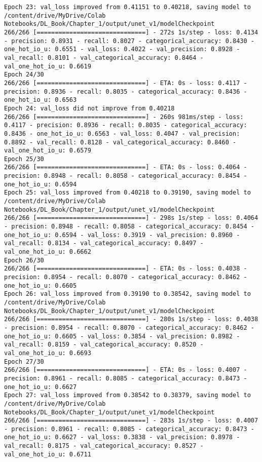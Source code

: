 \documentclass[
  letterpaper,
  DIV=11,
  numbers=noendperiod]{scrreprt}
\begin{document}
\begin{verbatim}
Epoch 23: val_loss improved from 0.41151 to 0.40218, saving model to /content/drive/MyDrive/Colab Notebooks/DL_Book/Chapter_1/output/unet_v1/modelCheckpoint
266/266 [==============================] - 272s 1s/step - loss: 0.4134 - precision: 0.8931 - recall: 0.8027 - categorical_accuracy: 0.8430 - one_hot_io_u: 0.6551 - val_loss: 0.4022 - val_precision: 0.8928 - val_recall: 0.8101 - val_categorical_accuracy: 0.8464 - val_one_hot_io_u: 0.6619
Epoch 24/30
266/266 [==============================] - ETA: 0s - loss: 0.4117 - precision: 0.8936 - recall: 0.8035 - categorical_accuracy: 0.8436 - one_hot_io_u: 0.6563
Epoch 24: val_loss did not improve from 0.40218
266/266 [==============================] - 260s 981ms/step - loss: 0.4117 - precision: 0.8936 - recall: 0.8035 - categorical_accuracy: 0.8436 - one_hot_io_u: 0.6563 - val_loss: 0.4047 - val_precision: 0.8892 - val_recall: 0.8128 - val_categorical_accuracy: 0.8460 - val_one_hot_io_u: 0.6579
Epoch 25/30
266/266 [==============================] - ETA: 0s - loss: 0.4064 - precision: 0.8948 - recall: 0.8058 - categorical_accuracy: 0.8454 - one_hot_io_u: 0.6594
Epoch 25: val_loss improved from 0.40218 to 0.39190, saving model to /content/drive/MyDrive/Colab Notebooks/DL_Book/Chapter_1/output/unet_v1/modelCheckpoint
266/266 [==============================] - 298s 1s/step - loss: 0.4064 - precision: 0.8948 - recall: 0.8058 - categorical_accuracy: 0.8454 - one_hot_io_u: 0.6594 - val_loss: 0.3919 - val_precision: 0.8960 - val_recall: 0.8134 - val_categorical_accuracy: 0.8497 - val_one_hot_io_u: 0.6662
Epoch 26/30
266/266 [==============================] - ETA: 0s - loss: 0.4038 - precision: 0.8954 - recall: 0.8070 - categorical_accuracy: 0.8462 - one_hot_io_u: 0.6605
Epoch 26: val_loss improved from 0.39190 to 0.38542, saving model to /content/drive/MyDrive/Colab Notebooks/DL_Book/Chapter_1/output/unet_v1/modelCheckpoint
266/266 [==============================] - 280s 1s/step - loss: 0.4038 - precision: 0.8954 - recall: 0.8070 - categorical_accuracy: 0.8462 - one_hot_io_u: 0.6605 - val_loss: 0.3854 - val_precision: 0.8982 - val_recall: 0.8159 - val_categorical_accuracy: 0.8520 - val_one_hot_io_u: 0.6693
Epoch 27/30
266/266 [==============================] - ETA: 0s - loss: 0.4007 - precision: 0.8961 - recall: 0.8085 - categorical_accuracy: 0.8473 - one_hot_io_u: 0.6627
Epoch 27: val_loss improved from 0.38542 to 0.38379, saving model to /content/drive/MyDrive/Colab Notebooks/DL_Book/Chapter_1/output/unet_v1/modelCheckpoint
266/266 [==============================] - 283s 1s/step - loss: 0.4007 - precision: 0.8961 - recall: 0.8085 - categorical_accuracy: 0.8473 - one_hot_io_u: 0.6627 - val_loss: 0.3838 - val_precision: 0.8978 - val_recall: 0.8175 - val_categorical_accuracy: 0.8527 - val_one_hot_io_u: 0.6711

\end{verbatim}
\end{document}
